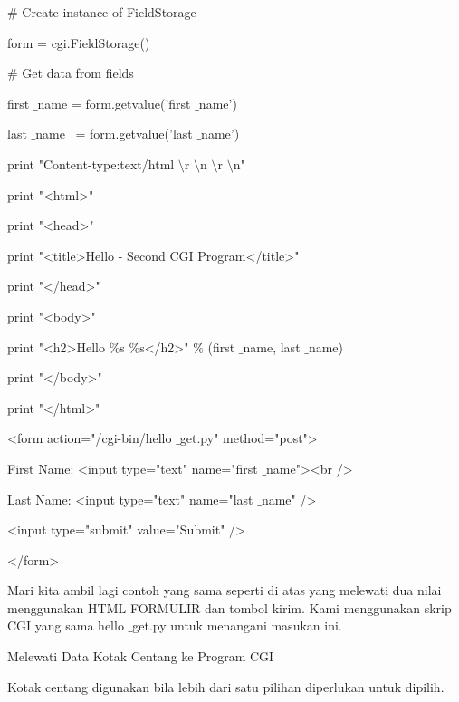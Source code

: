 \begin{12pt}
\begin{12pt}
\begin{12pt}
\begin{12pt}
\begin{12pt}
\begin{12pt}
\begin{12pt}
\vspace{12pt}
\noindent 
 $  \#  $ Create instance of FieldStorage  \par
\noindent 
form = cgi.FieldStorage()  \par
\vspace{12pt}
\noindent 
 $  \#  $ Get data from fields \par
\noindent 
first $  \_  $name = form.getvalue('first $  \_  $name') \par
\noindent 
last $  \_  $name~ = form.getvalue('last $  \_  $name') \par
\vspace{12pt}
\noindent 
print "Content-type:text/html $  \setminus  $r $  \setminus  $n $  \setminus  $r $  \setminus  $n" \par
\noindent 
print "<html>" \par
\noindent 
print "<head>" \par
\noindent 
print "<title>Hello - Second CGI Program</title>" \par
\noindent 
print "</head>" \par
\noindent 
print "<body>" \par
\noindent 
print "<h2>Hello  $  \%  $s  $  \%  $s</h2>"  $  \%  $ (first $  \_  $name, last $  \_  $name) \par
\noindent 
print "</body>" \par
\noindent 
print "</html>" \par
\vspace{12pt}
\noindent 
<form action="/cgi-bin/hello $  \_  $get.py" method="post"> \par
\noindent 
First Name: <input type="text" name="first $  \_  $name"><br /> \par
\noindent 
Last Name: <input type="text" name="last $  \_  $name" /> \par
\vspace{12pt}
\noindent 
<input type="submit" value="Submit" /> \par
\noindent 
</form> \par
\vspace{12pt}
Mari kita ambil lagi contoh yang sama seperti di atas yang melewati dua nilai menggunakan HTML FORMULIR dan tombol kirim. Kami menggunakan skrip CGI yang sama hello $  \_  $get.py untuk menangani masukan ini. \par
\noindent 
Melewati Data Kotak Centang ke Program CGI \par
\vspace{12pt}
\noindent 
Kotak centang digunakan bila lebih dari satu pilihan diperlukan untuk dipilih. \par

\end{12pt}
\end{12pt}
\end{12pt}
\end{12pt}
\end{12pt}
\end{12pt}
\end{12pt}

